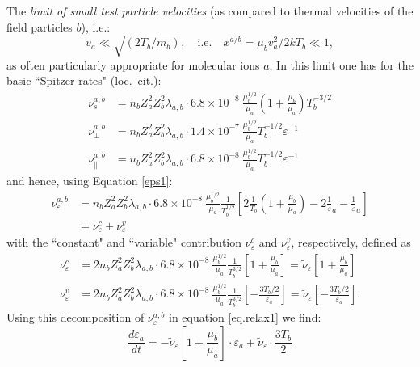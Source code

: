 \vspace{1cm}
The \emph{limit of small test particle velocities} (as compared to thermal
velocities of the field particles $b$), i.e.:
\begin{equation}
  \label{xab}
  v_a\ll \sqrt{(2T_b/m_b)},\quad  \mbox{i.e.} \quad  x^{a/b} = \mu_bv_a^2/2kT_b
  \ll 1,
\end{equation}
as often particularly
appropriate for molecular ions $a$,
In this limit one has for the basic ``Spitzer
rates" (loc.\ cit.):
\begin{align}
  \nu_s^{a,b}         & = n_b Z_a^2 Z_b^2\lambda_{a,b}\cdot
  6.8 \times 10^{-8}~\frac{\mu_b^{1/2}}{\mu_a}
  \left(1+\frac{\mu_b}{\mu_a}\right)T_b^{-3/2}                         \\
  \nu_\perp^{a,b}     & = n_b Z_a^2 Z_b^2\lambda_{a,b}\cdot 1.4 \times
  10^{-7}~\frac{\mu_b^{1/2}}{\mu_a}
  T_b^{-1/2}\varepsilon^{-1}
  \\
  \nu_\parallel^{a,b} & = n_b Z_a^2 Z_b^2\lambda_{a,b}\cdot 6.8 \times
  10^{-8}~\frac{\mu_b^{1/2}}{\mu_a}
  T_b^{-1/2}\varepsilon^{-1}
\end{align}
and hence, using Equation \cref{eps1}:
\begin{align}
  \nu_\varepsilon^{a,b} & = n_b Z_a^2 Z_b^2\lambda_{a,b}\cdot
  6.8 \times 10^{-8}~\frac{\mu_b^{1/2}}{\mu_a}\frac{1}{T_b^{1/2}}
  \left[2 \frac{1}{T_b}\left(1+\frac{\mu_b}{\mu_a}\right)-
    2\frac1\varepsilon_a-\frac1\varepsilon_a\right]              \\
                        & = \nu^c_\varepsilon +\nu^v_\varepsilon
\end{align}
with the ``constant" and ``variable" contribution $\nu^c_\varepsilon$ and
$\nu^v_\varepsilon$, respectively, defined as
\begin{align}
  \nu^c_\varepsilon & = 2 n_b Z_a^2 Z_b^2\lambda_{a,b}\cdot
  6.8 \times 10^{-8}~\frac{\mu_b^{1/2}}{\mu_a}\frac{1}{T_b^{3/2}}
  \left[1+\frac{\mu_b}{\mu_a}\right] =
  \tilde{\nu}_\varepsilon\left[1+\frac{\mu_b}{\mu_a}\right]
  \\
  \nu^v_\varepsilon & = 2 n_b Z_a^2 Z_b^2\lambda_{a,b}\cdot 6.8 \times
  10^{-8}~\frac{\mu_b^{1/2}}{\mu_a}\frac{1}{T_b^{3/2}}
  \left[-\frac{3T_b/2}{\varepsilon_a}\right] =
  \tilde{\nu}_\varepsilon\left[-\frac{3T_b/2}{\varepsilon_a}\right].
\end{align}
Using this decomposition of $\nu_\varepsilon^{a,b}$ in equation
\cref{eq.relax1} we find:
\begin{equation}
  \label{eq.relax2}
  \frac{d\varepsilon_a}{dt} =
  -\tilde{\nu}_\varepsilon\left[1+\frac{\mu_b}{\mu_a}\right] \cdot
  \varepsilon_a + \tilde{\nu}_\varepsilon\cdot \frac{3T_b}{2}
\end{equation}

